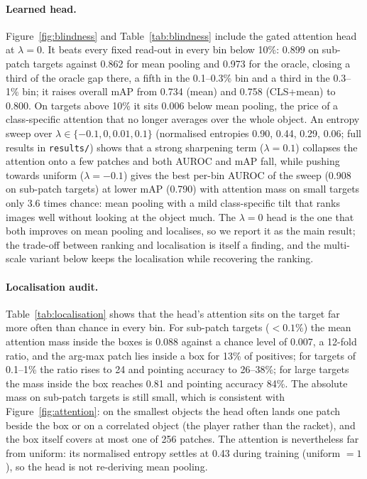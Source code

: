 \documentclass[10pt,letterpaper,twocolumn]{article}
\begin{document}
\paragraph{Learned head.}
Figure~\ref{fig:blindness} and Table~\ref{tab:blindness} include the gated attention head at
$\lambda=0$. It beats every fixed read-out in every bin below 10\%: 0.899 on sub-patch targets
against 0.862 for mean pooling and 0.973 for the oracle, closing a third of the oracle gap
there, a fifth in the 0.1--0.3\% bin and a third in the 0.3--1\% bin; it raises overall mAP from
0.734 (mean) and 0.758 (CLS+mean) to 0.800. On targets above 10\% it sits 0.006 below mean
pooling, the price of a class-specific attention that no longer averages over the whole object.
An entropy sweep over $\lambda\in\{-0.1, 0, 0.01, 0.1\}$ (normalised entropies 0.90, 0.44, 0.29, 0.06; full results in \texttt{results/}) shows that a strong sharpening term ($\lambda=0.1$) collapses the attention onto a few patches and both AUROC and mAP fall, while pushing towards uniform ($\lambda=-0.1$) gives the best per-bin AUROC of the sweep (0.908 on sub-patch targets) at lower mAP (0.790) with attention mass on small targets only 3.6 times chance: mean pooling with a mild class-specific tilt that ranks images well without looking at the object much. The
$\lambda=0$ head is the one that both improves on mean pooling and localises, so we report it
as the main result; the trade-off between ranking and localisation is itself a finding, and
the multi-scale variant below keeps the localisation while recovering the ranking.

\paragraph{Localisation audit.}
Table~\ref{tab:localisation} shows that the head's attention sits on the target far more often
than chance in every bin. For sub-patch targets ($<0.1\%$) the mean attention mass inside the
boxes is 0.088 against a chance level of 0.007, a 12-fold ratio, and the arg-max patch lies
inside a box for 13\% of positives; for targets of 0.1--1\% the ratio rises to 24 and pointing
accuracy to 26--38\%; for large targets the mass inside the box reaches 0.81 and pointing
accuracy 84\%. The absolute mass on sub-patch targets is still small, which is consistent with
Figure~\ref{fig:attention}: on the smallest objects the head often lands one patch beside the
box or on a correlated object (the player rather than the racket), and the box itself covers at
most one of 256 patches. The attention is nevertheless far from uniform: its normalised entropy
settles at 0.43 during training (uniform $=1$), so the head is not re-deriving mean pooling.
\end{document}

